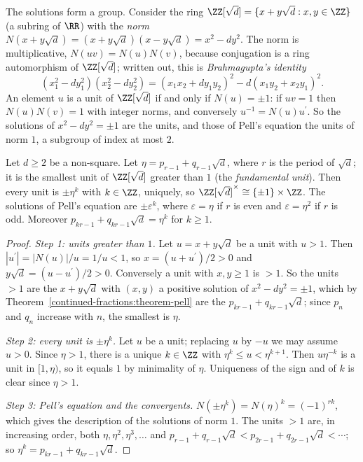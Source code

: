 The solutions form a group. Consider the ring $\ZZ[\sqrt d] = \{x + y\sqrt d : x, y \in \ZZ\}$ (a subring of $\RR$) with the \emph{norm} $N(x + y\sqrt d) = (x + y\sqrt d)(x - y\sqrt d) = x^2 - dy^2$.
The norm is multiplicative, $N(uv) = N(u)N(v)$, because conjugation is a ring automorphism of $\ZZ[\sqrt d]$; written out, this is \emph{Brahmagupta's identity}
\[
(x_1^2 - dy_1^2)(x_2^2 - dy_2^2) = (x_1x_2 + dy_1y_2)^2 - d(x_1y_2 + x_2y_1)^2.
\]
An element $u$ is a unit of $\ZZ[\sqrt d]$ if and only if $N(u) = \pm 1$: if $uv = 1$ then $N(u)N(v) = 1$ with integer norms, and conversely $u^{-1} = N(u)u^{\prime}$. So the solutions of
$x^2 - dy^2 = \pm 1$ are the units, and those of Pell's equation the units of norm $1$, a subgroup of index at most $2$.

\begin{theorem}\label{continued-fractions:theorem-pell-group}
Let $d \geq 2$ be a non-square. Let $\eta = p_{r-1} + q_{r-1}\sqrt d$, where $r$ is the period of $\sqrt d$; it is the smallest unit of $\ZZ[\sqrt d]$ greater than $1$ (the \emph{fundamental unit}).
Then every unit is $\pm\eta^k$ with $k \in \ZZ$, uniquely, so $\ZZ[\sqrt d]^\times \cong \{\pm 1\} \times \ZZ$. The solutions of Pell's equation are $\pm\varepsilon^k$, where $\varepsilon = \eta$ if $r$ is
even and $\varepsilon = \eta^2$ if $r$ is odd. Moreover $p_{kr-1} + q_{kr-1}\sqrt d = \eta^k$ for $k \geq 1$.
\end{theorem}

\begin{proof}
\emph{Step 1: units greater than $1$.} Let $u = x + y\sqrt d$ be a unit with $u > 1$. Then $|u^{\prime}| = |N(u)|/u = 1/u < 1$, so $x = (u + u^{\prime})/2 > 0$ and $y\sqrt d = (u - u^{\prime})/2 > 0$. Conversely
a unit with $x, y \geq 1$ is $> 1$. So the units $> 1$ are the $x + y\sqrt d$ with $(x, y)$ a positive solution of $x^2 - dy^2 = \pm 1$, which by Theorem~\ref{continued-fractions:theorem-pell} are the
$p_{kr-1} + q_{kr-1}\sqrt d$; since $p_n$ and $q_n$ increase with $n$, the smallest is $\eta$.

\emph{Step 2: every unit is $\pm\eta^k$.} Let $u$ be a unit; replacing $u$ by $-u$ we may assume $u > 0$. Since $\eta > 1$, there is a unique $k \in \ZZ$ with $\eta^k \leq u < \eta^{k+1}$. Then
$u\eta^{-k}$ is a unit in $[1, \eta)$, so it equals $1$ by minimality of $\eta$. Uniqueness of the sign and of $k$ is clear since $\eta > 1$.

\emph{Step 3: Pell's equation and the convergents.} $N(\pm\eta^k) = N(\eta)^k = (-1)^{rk}$, which gives the description of the solutions of norm $1$. The units $> 1$ are, in increasing order, both
$\eta, \eta^2, \eta^3, \ldots$ and $p_{r-1} + q_{r-1}\sqrt d < p_{2r-1} + q_{2r-1}\sqrt d < \cdots$; so $\eta^k = p_{kr-1} + q_{kr-1}\sqrt d$.
\end{proof}

